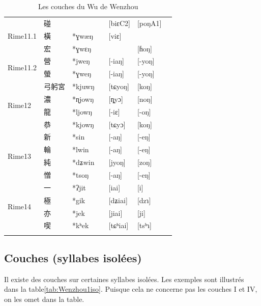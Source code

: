 \documentclass{scrbook}
\newcounter{c}[subsubsection]
\newcommand{\iso}{syllabes isolées\xspace}
\newcommand{\illustre}{Les exemples sont illustrés dans la table\xspace}
\begin{document}
\begin{sloppypar}
\begin{landscape}
\begin{longtable}[htbp]{lllllll}
    \midrule
    \multirow{3}[2]{*}{Rime11.1} & 碰     &       &       & [biɛC2]  & [poŋA1] &  \\
          & 橫     & *ɣwæŋ &       & [viɛ] &       &  \\
          & 宏     & *ɣwɛŋ &       &       & [ɦoŋ] &  \\
    \midrule
    \multirow{2}[2]{*}{Rime11.2} & 營     & *jweŋ &       & [-iaŋ] & [-yoŋ] &  \\
          & 螢     & *ɣweŋ &       & [-iaŋ] & [-yoŋ] &  \\
    \midrule
    \multirow{4}[2]{*}{Rime12} & 弓躬宮   & *kjuwŋ &       & [tɕyoŋ] & [koŋ] &  \\
          & 濃     & *ɳjowŋ &       & [ȵyɔ] & [noŋ] &  \\
          & 龍     & *ljowŋ &       & [-iɛ] & [-oŋ] &  \\
          & 恭     & *kjowŋ &       & [tɕyɔ] & [koŋ] &  \\
    \midrule
    \multirow{4}[2]{*}{Rime13} & 新     & *sin  &       & [-aŋ] & [-eŋ] &  \\
          & 輪     & *lwin &       & [-aŋ] & [-eŋ] &  \\
          & 純     & *dʑwin &       & [jyoŋ] & [zoŋ] &  \\
          & 憎     & *tsoŋ &       & [-aŋ] & [-eŋ] &  \\
    \midrule
    \multirow{4}[2]{*}{Rime14} & 一     & *ʔjit &       & [iai] & [i]   &  \\
          & 極     & *gik  &       & [dʑiai] & [dzɿ] &  \\
          & 亦     & *jek  &       & [jiai] & [ji]  &  \\
          & 喫     & *kʰek &       & [tɕʰiai] & [tsʰɿ] &  \\
    \bottomrule
  \caption{Les couches du Wu de Wenzhou}
  \label{tab:Wenzhou1}%
\end{longtable}%
\end{landscape}

\subsection{Couches (\iso)}
Il existe des couches sur certaines \iso. \illustre \ref{tab:Wenzhou1iso}. Puisque cela ne concerne pas les couches I et IV, on les omet dans la table.


\end{sloppypar}
\end{document}

